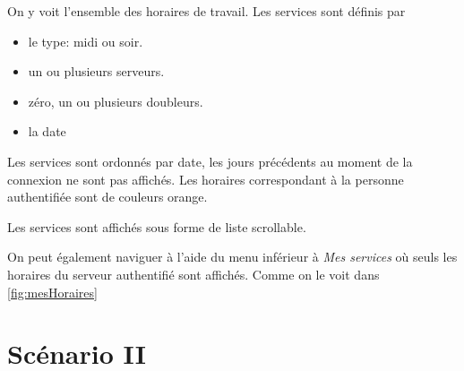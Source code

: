 On y voit l'ensemble des horaires de travail. Les services sont définis par
\begin{itemize}
    \item le type: midi ou soir.
    \item un ou plusieurs serveurs.
    \item zéro, un ou plusieurs doubleurs.
    \item la date
\end{itemize}
Les services sont ordonnés par date, les jours précédents au moment de la connexion ne 
sont pas affichés. Les horaires correspondant à la personne authentifiée sont de couleurs orange.

Les services sont affichés sous forme de liste scrollable.

On peut également naviguer à l'aide du menu inférieur à \textit{Mes services} où seuls les horaires du serveur authentifié sont affichés. Comme on le voit 
dans \ref{fig:mesHoraires}

\section[Mise en bourse d'un service - Scénario II]{Scénario II}
